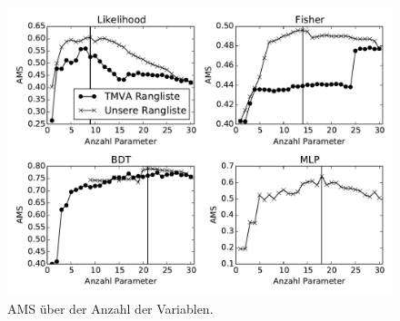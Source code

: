 \begin{figure}[htp]
\begin{center}
  \includegraphics[width=\linewidth]{sections/subset_of_parameters/parameter_count_ranking_by_method.pdf}
  \caption[AMS über der Anzahl der Parameter]{AMS über der Anzahl der Variablen.}
  \label{fig:ams_over_parameter_count}
\end{center}
\end{figure}

